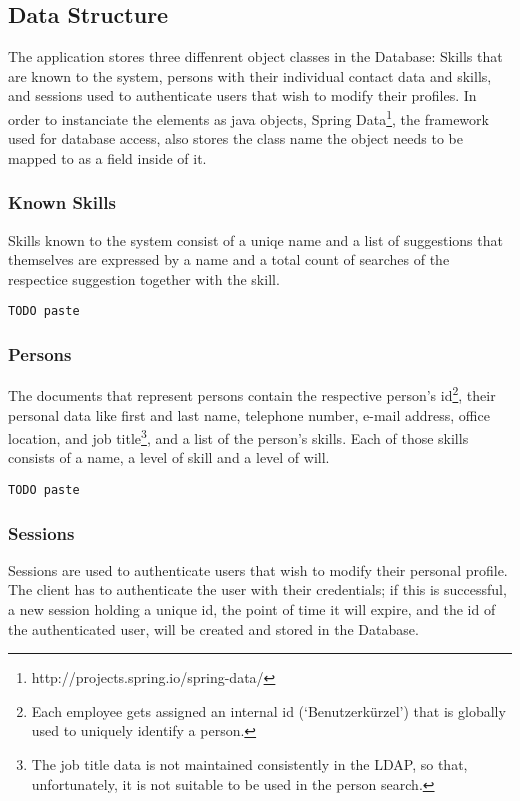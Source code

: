 \subsection{Data Structure}
The application stores three diffenrent object classes in the Database: Skills that are known to the system, persons with their individual contact data and skills, and sessions used to authenticate users that wish to modify their profiles. In order to instanciate the elements as java objects, Spring Data\footnote{http://projects.spring.io/spring-data/}, the framework used for database access, also stores the class name the object needs to be mapped to as a field inside of it.

\subsubsection{Known Skills}
Skills known to the system consist of a uniqe name and a list of suggestions that themselves are expressed by a name and a total count of searches of the respectice suggestion together with the skill.

\begin{lstlisting}[language=JS]
TODO paste
\end{lstlisting}

\subsubsection{Persons}
The documents that represent persons contain the respective person's id\footnote{Each employee gets assigned an internal id (`Benutzerkürzel') that is globally used to uniquely identify a person.}, their personal data like first and last name, telephone number, e-mail address, office location, and job title\footnote{The job title data is not maintained consistently in the LDAP, so that, unfortunately, it is not suitable to be used in the person search.}, and a list of the person's skills. Each of those skills consists of a name, a level of skill and a level of will.

\begin{lstlisting}[language=JS]
TODO paste
\end{lstlisting}

\subsubsection{Sessions}
Sessions are used to authenticate users that wish to modify their personal profile. The client has to authenticate the user with their credentials; if this is successful, a new session holding a unique id, the point of time it will expire, and the id of the authenticated user, will be created and stored in the Database.

